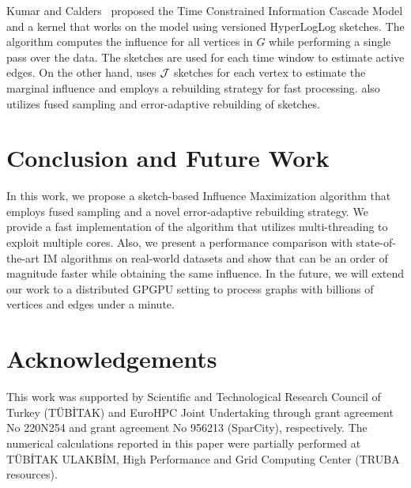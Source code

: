 Kumar and Calders~\cite{kumar2017information} proposed the Time Constrained Information Cascade Model and a kernel that works on the model using versioned HyperLogLog sketches. The algorithm computes the influence for all vertices in $G$ while performing a single pass over the data. The sketches are used for each time window to estimate active edges. On the other hand, \acro uses ${\cal J}$ sketches for each vertex to estimate the marginal influence and employs a rebuilding strategy for fast processing. \acro also utilizes fused sampling and error-adaptive rebuilding of sketches.

\section{Conclusion and Future Work}\label{sec:conclusion}

In this work, we propose a sketch-based Influence Maximization algorithm that employs fused sampling and a novel error-adaptive rebuilding strategy. We provide a fast implementation of the algorithm that utilizes multi-threading to exploit multiple cores. Also, we present a performance comparison with state-of-the-art IM algorithms on real-world datasets and show that \acro{} can be an order of magnitude faster while obtaining the same influence. 
In the future, we will extend our work to a distributed GPGPU setting to process graphs with billions of vertices and edges under a minute. 



\section*{Acknowledgements}

This work was supported by Scientific and Technological Research Council of Turkey (TÜBİTAK) and EuroHPC Joint Undertaking through grant agreement No 220N254 and grant agreement No 956213 (SparCity), respectively. The numerical calculations reported in this paper were partially performed at T{\"{U}}B\.{I}TAK ULAKB\.{I}M, High Performance and Grid Computing Center (TRUBA resources).

